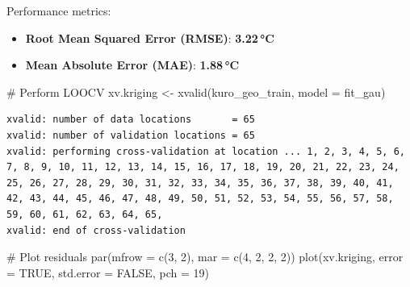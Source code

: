 \documentclass[
  11pt,
]{article}
\newenvironment{Shaded}{\begin{snugshade}}{\end{snugshade}}
\newcommand{\AttributeTok}[1]{\textcolor[rgb]{0.40,0.45,0.13}{#1}}
\newcommand{\CommentTok}[1]{\textcolor[rgb]{0.37,0.37,0.37}{#1}}
\newcommand{\ConstantTok}[1]{\textcolor[rgb]{0.56,0.35,0.01}{#1}}
\newcommand{\DecValTok}[1]{\textcolor[rgb]{0.68,0.00,0.00}{#1}}
\newcommand{\FunctionTok}[1]{\textcolor[rgb]{0.28,0.35,0.67}{#1}}
\newcommand{\NormalTok}[1]{\textcolor[rgb]{0.00,0.23,0.31}{#1}}
\newcommand{\OtherTok}[1]{\textcolor[rgb]{0.00,0.23,0.31}{#1}}
\begin{document}
Performance metrics:

\begin{itemize}
\item
  \textbf{Root Mean Squared Error (RMSE)}: \textbf{3.22\,°C}
\item
  \textbf{Mean Absolute Error (MAE)}: \textbf{1.88\,°C}
\end{itemize}

\begin{Shaded}
\begin{Highlighting}[]
\CommentTok{\# Perform LOOCV}
\NormalTok{xv.kriging }\OtherTok{\textless{}{-}} \FunctionTok{xvalid}\NormalTok{(kuro\_geo\_train, }\AttributeTok{model =}\NormalTok{ fit\_gau)}
\end{Highlighting}
\end{Shaded}

\begin{verbatim}
xvalid: number of data locations       = 65
xvalid: number of validation locations = 65
xvalid: performing cross-validation at location ... 1, 2, 3, 4, 5, 6, 7, 8, 9, 10, 11, 12, 13, 14, 15, 16, 17, 18, 19, 20, 21, 22, 23, 24, 25, 26, 27, 28, 29, 30, 31, 32, 33, 34, 35, 36, 37, 38, 39, 40, 41, 42, 43, 44, 45, 46, 47, 48, 49, 50, 51, 52, 53, 54, 55, 56, 57, 58, 59, 60, 61, 62, 63, 64, 65, 
xvalid: end of cross-validation
\end{verbatim}

\begin{Shaded}
\begin{Highlighting}[]
\CommentTok{\# Plot residuals}
\FunctionTok{par}\NormalTok{(}\AttributeTok{mfrow =} \FunctionTok{c}\NormalTok{(}\DecValTok{3}\NormalTok{, }\DecValTok{2}\NormalTok{), }\AttributeTok{mar =} \FunctionTok{c}\NormalTok{(}\DecValTok{4}\NormalTok{, }\DecValTok{2}\NormalTok{, }\DecValTok{2}\NormalTok{, }\DecValTok{2}\NormalTok{))}
\FunctionTok{plot}\NormalTok{(xv.kriging, }\AttributeTok{error =} \ConstantTok{TRUE}\NormalTok{, }\AttributeTok{std.error =} \ConstantTok{FALSE}\NormalTok{, }\AttributeTok{pch =} \DecValTok{19}\NormalTok{)}
\end{Highlighting}
\end{Shaded}
\end{document}

